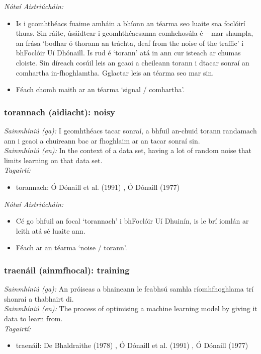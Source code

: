  \noindent \textit{Nótaí Aistriúcháin:}
\begin{itemize}
	\item Is i gcomhthéacs fuaime amháin a bhíonn an téarma seo luaite sna foclóirí thuas. Sin ráite, úsáidtear i gcomhthéacsanna comhchosúla é -- mar shampla, an frása `bodhar ó thorann an tráchta, deaf from the noise of the traffic' i bhFoclóir Uí Dhónaill. Is rud é `torann' atá in ann cur isteach ar chumas cloiste. Sin díreach cosúil leis an gcaoi a cheileann torann i dtacar sonraí an comhartha in-fhoghlamtha. Gglactar leis an téarma seo mar sin.
	\item Féach chomh maith ar an téarma `signal / comhartha'.
\end{itemize}


\subsubsection*{torannach (aidiacht): noisy}
 \noindent \textit{Sainmhíniú (ga):} I gcomhthéacs tacar sonraí, a bhfuil an-chuid torann randamach ann i gcaoi a chuireann bac ar fhoghlaim ar an tacar sonraí sin.
\\
 \noindent \textit{Sainmhíniú (en):} In the context of a data set, having a lot of random noise that limits learning on that data set.
\\
 \noindent \textit{Tagairtí:}
\begin{itemize}
	\item torannach: Ó Dónaill et al. (1991) \cite{focloir-beag}, Ó Dónaill (1977) \cite{odonaill}
\end{itemize}

 \noindent \textit{Nótaí Aistriúcháin:}
\begin{itemize}
	\item Cé go bhfuil an focal `torannach' i bhFoclóir Uí Dhuinín, is le brí iomlán ar leith atá sé luaite ann.
	\item Féach ar an téarma `noise / torann'.
\end{itemize}


\subsubsection*{traenáil (ainmfhocal): training}
 \noindent \textit{Sainmhíniú (ga):} An próiseas a bhaineann le feabhsú samhla ríomhfhoghlama trí shonraí a thabhairt di.
\\
 \noindent \textit{Sainmhíniú (en):} The process of optimising a machine learning model by giving it data to learn from.
\\
 \noindent \textit{Tagairtí:}
\begin{itemize}
	\item traenáil: De Bhaldraithe (1978) \cite{de-bhaldraithe}, Ó Dónaill et al. (1991) \cite{focloir-beag}, Ó Dónaill (1977) \cite{odonaill}
\end{itemize}

